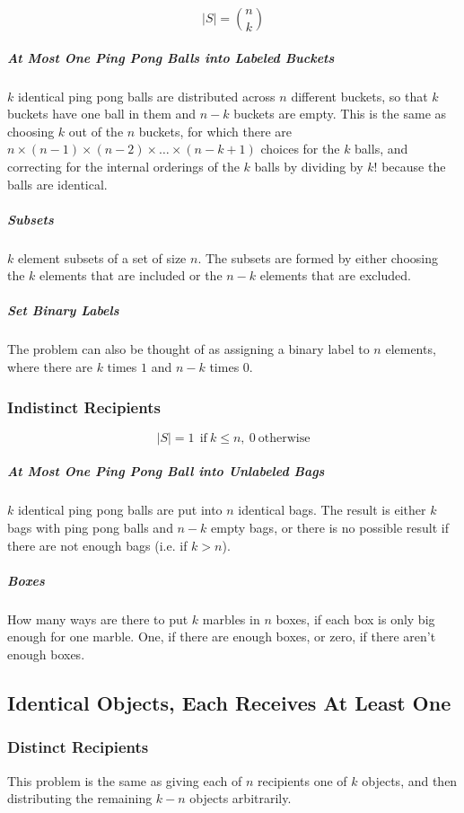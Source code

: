 \begin{equation}
|S| = { n \choose k}
\end{equation}


\subparagraph{At Most One Ping Pong Balls into Labeled Buckets} $k$ identical ping pong balls are distributed across $n$ different buckets, so that $k$ buckets have one ball in them and $n-k$ buckets are empty. This is the same as choosing $k$ out of the $n$ buckets, for which there are $n\times(n-1)\times(n-2)\times\hdots\times(n-k+1)$ choices for the $k$ balls, and correcting for the internal orderings of the $k$ balls by dividing by $k!$ because the balls are identical.

\subparagraph{Subsets} $k$ element subsets of a set of size $n$. The subsets are formed by either choosing the $k$ elements that are included or the $n-k$ elements that are excluded.

\subparagraph{Set Binary Labels} The problem can also be thought of as assigning a binary label to $n$ elements, where there are $k$ times $1$ and $n-k$ times 0.

\subsubsection{Indistinct Recipients}

\begin{equation}
|S| = 1\ \ \mathrm{if\ }k \leq n,\ 0\ \mathrm{otherwise}
\end{equation}

\subparagraph{At Most One Ping Pong Ball into Unlabeled Bags}  $k$ identical ping pong balls are put into $n$ identical bags. The result is either $k$ bags with ping pong balls and $n-k$ empty bags, or there is no possible result if there are not enough bags (i.e. if $k>n$).

\subparagraph{Boxes} How many ways are there to put $k$ marbles in $n$ boxes, if each box is only big enough for one marble. One, if there are enough boxes, or zero, if there aren't enough boxes.


\subsection{Identical Objects, Each Receives At Least One}

\subsubsection{Distinct Recipients}
This problem is the same as giving each of $n$ recipients one of $k$ objects, and then distributing the remaining $k-n$ objects arbitrarily.  

